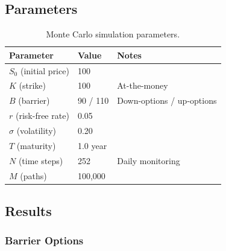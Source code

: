 \documentclass[12pt,a4paper]{article}
\begin{document}
\subsection{Parameters}

\begin{table}[H]
\centering
\caption{Monte Carlo simulation parameters.}
\label{tab:params_a}
\begin{tabular}{L{3.5cm} C{2.5cm} L{6cm}}
\toprule
\textbf{Parameter} & \textbf{Value} & \textbf{Notes} \\
\midrule
$S_0$ (initial price)    & 100          & \\
$K$ (strike)             & 100          & At-the-money \\
$B$ (barrier)            & 90 / 110     & Down-options / up-options \\
$r$ (risk-free rate)     & 0.05         & \\
$\sigma$ (volatility)    & 0.20         & \\
$T$ (maturity)           & 1.0 year     & \\
$N$ (time steps)         & 252          & Daily monitoring \\
$M$ (paths)              & 100{,}000    & \\
\bottomrule
\end{tabular}
\end{table}

\subsection{Results}

\subsubsection{Barrier Options}
\end{document}
